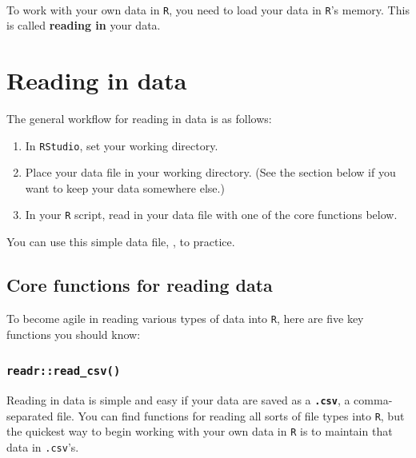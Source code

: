 \documentclass[]{book}
\providecommand{\tightlist}{%
  \setlength{\itemsep}{0pt}\setlength{\parskip}{0pt}}
\begin{document}
~

To work with your own data in \texttt{R}, you need to load your data in \texttt{R}'s memory. This is called \textbf{reading in} your data.

\hypertarget{reading-in-data}{%
\section*{Reading in data}\label{reading-in-data}}

The general workflow for reading in data is as follows:

\begin{enumerate}
\def\labelenumi{\arabic{enumi}.}
\tightlist
\item
  In \texttt{RStudio}, set your working directory.
\item
  Place your data file in your working directory. (See the section below if you want to keep your data somewhere else.)
\item
  In your \texttt{R} script, read in your data file with one of the core functions below.
\end{enumerate}

You can use this simple data file, , to practice.

\hypertarget{core-functions-for-reading-data}{%
\subsection*{Core functions for reading data}\label{core-functions-for-reading-data}}

To become agile in reading various types of data into \texttt{R}, here are five key functions you should know:

\hypertarget{readrread_csv}{%
\subsubsection*{\texorpdfstring{\texttt{readr::read\_csv()}}{readr::read\_csv()}}\label{readrread_csv}}

Reading in data is simple and easy if your data are saved as a \textbf{\texttt{.csv}}, a comma-separated file. You can find functions for reading all sorts of file types into \texttt{R}, but the quickest way to begin working with your own data in \texttt{R} is to maintain that data in \texttt{.csv}'s.
\end{document}
